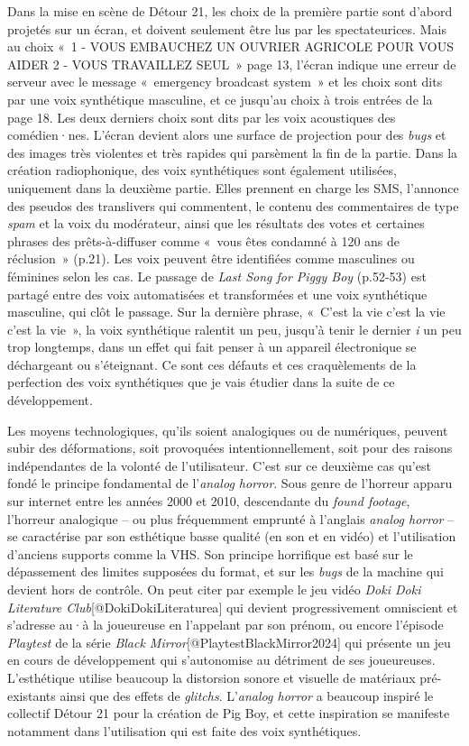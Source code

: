 \documentclass[
]{article}
\begin{document}
Dans la mise en scène de Détour 21, les choix de la première partie sont d'abord projetés sur un écran, et doivent seulement être lus par les spectateurices. Mais au choix «~1 - VOUS EMBAUCHEZ UN OUVRIER AGRICOLE POUR VOUS AIDER 2 - VOUS TRAVAILLEZ SEUL~» page 13, l'écran indique une erreur de serveur avec le message «~emergency broadcast system~» et les choix sont dits par une voix synthétique masculine, et ce jusqu'au choix à trois entrées de la page 18. Les deux derniers choix sont dits par les voix acoustiques des comédien·nes. L'écran devient alors une surface de projection pour des \emph{bugs} et des images très violentes et très rapides qui parsèment la fin de la partie. Dans la création radiophonique, des voix synthétiques sont également utilisées, uniquement dans la deuxième partie. Elles prennent en charge les SMS, l'annonce des pseudos des translivers qui commentent, le contenu des commentaires de type \emph{spam }et la voix du modérateur, ainsi que les résultats des votes et certaines phrases des prêts-à-diffuser comme «~vous êtes condamné à 120 ans de réclusion~» (p.21). Les voix peuvent être identifiées comme masculines ou féminines selon les cas. Le passage de \emph{Last Song for Piggy Boy} (p.52-53) est partagé entre des voix automatisées et transformées et une voix synthétique masculine, qui clôt le passage. Sur la dernière phrase, «~C'est la vie c'est la vie c'est la vie~», la voix synthétique ralentit un peu, jusqu'à tenir le dernier \emph{i} un peu trop longtemps, dans un effet qui fait penser à un appareil électronique se déchargeant ou s'éteignant. Ce sont ces défauts et ces craquèlements de la perfection des voix synthétiques que je vais étudier dans la suite de ce développement.

Les moyens technologiques, qu'ils soient analogiques ou de numériques, peuvent subir des déformations, soit provoquées intentionnellement, soit pour des raisons indépendantes de la volonté de l'utilisateur. C'est sur ce deuxième cas qu'est fondé le principe fondamental de l'\emph{analog horror}. Sous genre de l'horreur apparu sur internet entre les années 2000 et 2010, descendante du \emph{found footage}, l'horreur analogique -- ou plus fréquemment emprunté à l'anglais \emph{analog horror} -- se caractérise par son esthétique basse qualité (en son et en vidéo) et l'utilisation d'anciens supports comme la VHS. Son principe horrifique est basé sur le dépassement des limites supposées du format, et sur les \emph{bugs} de la machine qui devient hors de contrôle. On peut citer par exemple le jeu vidéo \emph{Doki Doki Literature Club}{[}@DokiDokiLiteraturea{]} qui devient progressivement omniscient et s'adresse au·à la joueureuse en l'appelant par son prénom, ou encore l'épisode \emph{Playtest} de la série \emph{Black Mirror}{[}@PlaytestBlackMirror2024{]} qui présente un jeu en cours de développement qui s'autonomise au détriment de ses joueureuses. L'esthétique utilise beaucoup la distorsion sonore et visuelle de matériaux pré-existants ainsi que des effets de \emph{glitchs}. L'\emph{analog horror }a beaucoup inspiré le collectif Détour 21 pour la création de Pig Boy, et cette inspiration se manifeste notamment dans l'utilisation qui est faite des voix synthétiques.
\end{document}
